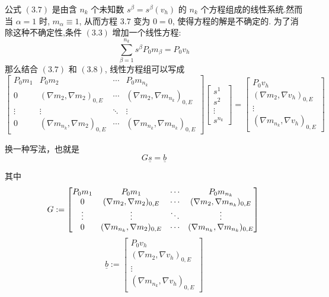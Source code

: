     公式 $(3.7)$ 是由含 $n_k$ 个未知数 $s^{\beta} = s^{\beta}(v_h)$ 的 $n_k$ 个方程组成的线性系统.然而当 $\alpha = 1$ 时, $m_{\alpha} \equiv 1$, 从而方程 $3.7$ 变为 $0 = 0$, 使得方程的解是不确定的. 为了消除这种不确定性,条件 $(3.3)$ 增加一个线性方程: \\
    \begin{equation}
    \sum_{\beta = 1}^{n_k}s^{\beta}P_0m_{\beta} = P_0v_h
    \end{equation}
    那么结合 $(3.7)$ 和 $(3.8)$, 线性方程组可以写成 \\
    \begin{equation*}
    \left[ \begin{array}{cccc}
    P_0m_1 & P_0m_2  &\cdots&P_0m_{n_k} \\
    0 & (\nabla m_2,\nabla m_2)_{0,E} & \cdots & (\nabla m_2,\nabla m_{n_k})_{0,E} \\
    \vdots & \vdots & \ddots & \vdots\\
    0& (\nabla m_{n_k},\nabla m_2)_{0,E} & \cdots & (\nabla m_{n_k},\nabla m_{n_k})_{0,E}
    \end{array} \right]
    \left[ \begin{array}{c}
    s^1\\
    s^2\\
    \vdots\\
    s^{n_k}
    \end{array} \right]
    = \left[\begin{array}{c}
    P_0v_h\\
    (\nabla m_2,\nabla v_h)_{0,E} \\
    \vdots\\
    (\nabla m_{n_k},\nabla v_h)_{0,E} 
    \end{array}\right]
    \end{equation*}
    
    换一种写法，也就是 \\
    \begin{equation}
    G\underline{s} = \underline{b}
    \end{equation}
    
    其中 \\
    \begin{equation}
    G := \begin{bmatrix}
    P_0m_1 & P_0m_1 &\cdots&P_0m_{n_k} \\
    0 & (\nabla m_2,\nabla m_2)_{0,E} & \cdots & (\nabla m_2,\nabla m_{n_k})_{0,E} \\
    \vdots & \vdots & \ddots & \vdots\\
    0& (\nabla m_{n_k},\nabla m_2)_{0,E} & \cdots & (\nabla m_{n_k},\nabla m_{n_k})_{0,E}
    \end{bmatrix}\\
    \end{equation}
    \begin{equation}
    \underline b := \begin{bmatrix}
    P_0v_h\\
    (\nabla m_2,\nabla v_h)_{0,E} \\
    \vdots\\
    (\nabla m_{n_k},\nabla v_h)_{0,E} 
    \end{bmatrix}
    \end{equation}
    
